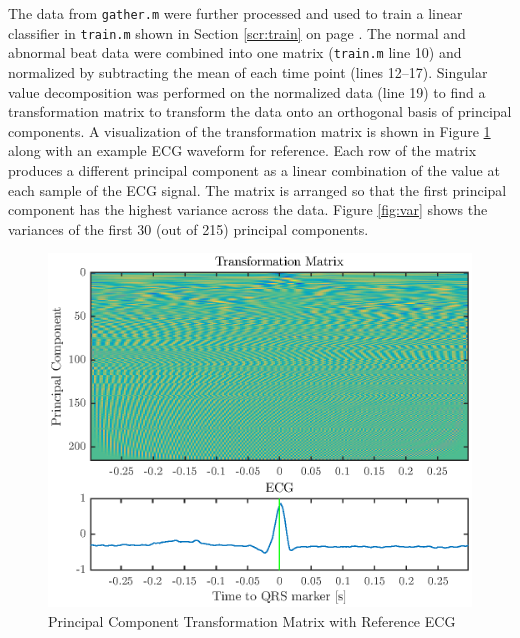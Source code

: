\documentclass[12pt,letter]{article}
\newcommand{\rpref}[1]{\ref{#1} on page \pageref{#1}}
\begin{document}
The data from \verb`gather.m` were further processed and used to train a linear
classifier in \verb`train.m` shown in Section \rpref{scr:train}.  The normal and
abnormal beat data were combined into one matrix (\verb`train.m` line 10) and
normalized by subtracting the mean of each time point (lines 12--17).  Singular
value decomposition was performed on the normalized data (line 19) to find a
transformation matrix to transform the data onto an orthogonal basis of
principal components.  A visualization of the transformation matrix is shown in
Figure \ref{fig:transform} along with an example ECG waveform for reference.
Each row of the matrix produces a different principal component as a linear
combination of the value at each sample of the ECG signal.  The matrix is
arranged so that the first principal component has the highest variance across
the data.  Figure \ref{fig:var} shows the variances of the first 30 (out of 215)
principal components.  

\begin{figure}[htbp]
    \centering
    \includegraphics[height=0.42\textheight]{../figures/train_01}
    \caption{Principal Component Transformation Matrix with Reference ECG}
    \label{fig:transform}
\end{figure}
\end{document}
